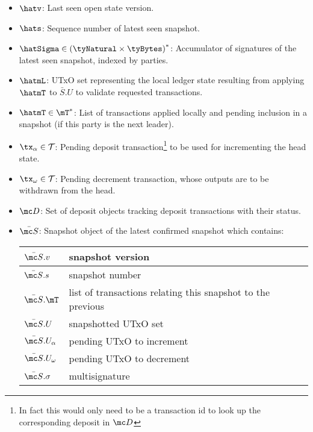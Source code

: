 \begin{itemize}
  \item $\hatv$: Last seen open state version.
  \item $\hats$: Sequence number of latest seen snapshot.
  \item $\hatSigma \in {(\tyNatural \times \tyBytes)}^{*}$: Accumulator of
        signatures of the latest seen snapshot, indexed by parties.
  \item $\hatmL$: UTxO set representing the local ledger state resulting from
        applying $\hatmT$ to $\bar{S}.U$ to validate requested transactions.
  \item $\hatmT \in \mT^{*}$: List of transactions applied locally and pending
        inclusion in a snapshot (if this party is the next leader).
  \item $\tx_\alpha \in \mathcal{T}$: Pending deposit transaction\footnote{In
        fact this would only need to be a transaction id to look up the
        corresponding deposit in $\mc D$} to be used for incrementing the head
        state.
  \item $\tx_\omega \in \mathcal{T}$: Pending decrement transaction, whose outputs are to be
        withdrawn from the head.
  \item $\mc D$: Set of deposit objects tracking deposit transactions with their
        status.
  \item $\bar{\mc S}$: Snapshot object of the latest confirmed snapshot which
        contains:
        \begin{center}
          \begin{tabular}{|l|l|}\hline
            $\bar{\mc S}.v$         & snapshot version \\ \hline
            $\bar{\mc S}.s$         & snapshot number \\ \hline
            $\bar{\mc S}.\mT$       & list of transactions relating this snapshot to the previous \\ \hline
            $\bar{\mc S}.U$         & snapshotted UTxO set \\ \hline
            $\bar{\mc S}.U_\alpha$ & pending UTxO to increment \\ \hline
            $\bar{\mc S}.U_\omega$       & pending UTxO to decrement \\ \hline
            $\bar{\mc S}.\sigma$         & multisignature \\ \hline
          \end{tabular}
        \end{center}
\end{itemize}

